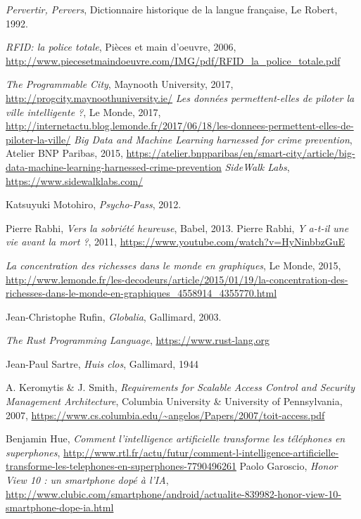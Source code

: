 \begin{thebibliography}{99}
     \emph{Pervertir, Pervers}, Dictionnaire historique de la langue française, Le Robert, 1992.

     \emph{RFID: la police totale}, Pièces et main d'oeuvre, 2006, \url{http://www.piecesetmaindoeuvre.com/IMG/pdf/RFID_la_police_totale.pdf}

     \emph{The Programmable City}, Maynooth University, 2017, \url{http://progcity.maynoothuniversity.ie/}
     \emph{Les données permettent-elles de piloter la ville intelligente ?}, Le Monde, 2017, \url{http://internetactu.blog.lemonde.fr/2017/06/18/les-donnees-permettent-elles-de-piloter-la-ville/}
     \emph{Big Data and Machine Learning harnessed for crime prevention}, Atelier BNP Paribas, 2015, \url{https://atelier.bnpparibas/en/smart-city/article/big-data-machine-learning-harnessed-crime-prevention}
     \emph{SideWalk Labs}, \url{https://www.sidewalklabs.com/}

     Katsuyuki Motohiro, \emph{Psycho-Pass}, 2012.

     Pierre Rabhi, \emph{Vers la sobriété heureuse}, Babel, 2013.
     Pierre Rabhi, \emph{Y a-t-il une vie avant la mort ?}, 2011, \url{https://www.youtube.com/watch?v=HyNinbbzGuE}

     \emph{La concentration des richesses dans le monde en graphiques}, Le Monde, 2015, \url{http://www.lemonde.fr/les-decodeurs/article/2015/01/19/la-concentration-des-richesses-dans-le-monde-en-graphiques_4558914_4355770.html}

     Jean-Christophe Rufin, \emph{Globalia}, Gallimard, 2003.

     \emph{The Rust Programming Language}, \url{https://www.rust-lang.org}

     Jean-Paul Sartre, \emph{Huis clos}, Gallimard, 1944
    
     A. Keromytis \& J. Smith, \emph{Requirements for Scalable Access Control and Security Management Architecture}, Columbia University \& University of Pennsylvania, 2007, \url{https://www.cs.columbia.edu/~angelos/Papers/2007/toit-access.pdf}

     Benjamin Hue, \emph{Comment l'intelligence artificielle transforme les téléphones en superphones}, \url{http://www.rtl.fr/actu/futur/comment-l-intelligence-artificielle-transforme-les-telephones-en-superphones-7790496261}
     Paolo Garoscio, \emph{Honor View 10 : un smartphone dopé à l'IA}, \url{http://www.clubic.com/smartphone/android/actualite-839982-honor-view-10-smartphone-dope-ia.html}


\end{thebibliography}
